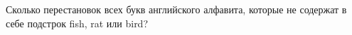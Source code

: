 \question
Сколько перестановок всех букв английского алфавита, которые не содержат в себе подстрок fish,  rat или bird?

